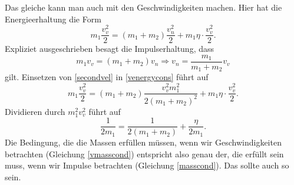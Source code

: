 \begin{Answer}[ref = ipho201741]
	Das gleiche kann man auch mit den Geschwindigkeiten machen. Hier hat die Energieerhaltung die Form
	\begin{equation}\label{venergycons}
		m_1 \frac{v_v^2}{2} = \left(m_1+m_2\right)\frac{v_n^2}{2} + m_1\eta  \cdot \frac{v_v^2}{2}.
	\end{equation}
	Expliziet ausgeschrieben besagt die Impulserhaltung, dass 
	\begin{equation}\label{secondvel}
		m_1 v_v = \left(m_1+m_2\right)v_n \Rightarrow v_n = \frac{m_1}{m_1+m_2}v_v
	\end{equation}
	gilt. Einsetzen von \eqref{secondvel} in \eqref{venergycons} führt auf
	\begin{equation*}
	m_1\frac{v_v^2}{2} = \left(m_1+m_2\right)\frac{v_v^2 m_1^2}{2\left(m_1+m_2\right)^2} + m_1\eta \cdot \frac{v_v^2}{2}.
	\end{equation*}
	Dividieren durch $m_1^2v_v^2$ führt auf 
	\begin{equation}\label{vmasscond}
		\frac{1}{2m_1} = \frac{1}{2\left(m_1+m_2\right)} + \frac{\eta}{2m_1}.
	\end{equation}
	Die Bedingung, die die Massen erfüllen müssen, wenn wir Geschwindigkeiten betrachten (Gleichung \eqref{vmasscond}) entspricht also genau der, die erfüllt sein muss, wenn wir Impulse betrachten (Gleichung \eqref{masscond}). Das sollte auch so sein.
\end{Answer}
